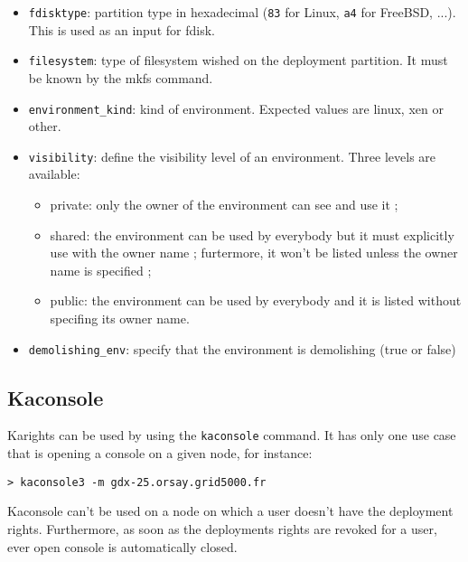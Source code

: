 \documentclass[a4wide,10pt,oneside]{book}
\begin{document}
\begin{itemize}
\item \texttt{fdisktype}: partition type in hexadecimal (\texttt{83} for Linux, \texttt{a4} for FreeBSD, ...). This is used as an input for fdisk.
\item \texttt{filesystem}: type of filesystem wished on the deployment partition. It must be known by the mkfs command.
\item \texttt{environment\_kind}: kind of environment. Expected values are linux, xen or other.
\item \texttt{visibility}: define the visibility level of an environment. Three levels are available:
\begin{itemize}
\item private: only the owner of the environment can see and use it ;
\item shared: the environment can be used by everybody but it must explicitly use with the owner name ; furtermore, it won't be listed unless the owner name is specified ;
\item public: the environment can be used by everybody and it is listed without specifing its owner name.
\end{itemize}
\item \texttt{demolishing\_env}: specify that the environment is demolishing (true or false)
\end{itemize}

\subsection{Kaconsole}\label{sec:kaconsole}
Karights can be used by using the \texttt{kaconsole} command. It has only one use case that is opening a console on a given node, for instance:
\begin{verbatim}
> kaconsole3 -m gdx-25.orsay.grid5000.fr
\end{verbatim}

Kaconsole can't be used on a node on which a user doesn't have the deployment rights. Furthermore, as soon as the deployments rights are revoked for a user, ever open console is automatically closed.
\end{document}
